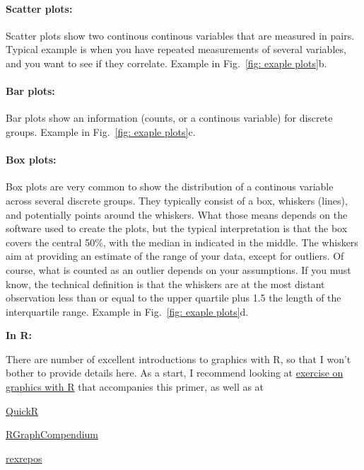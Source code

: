 \documentclass[a4paper,twoside]{tufte-book}\usepackage[]{graphicx}\usepackage[]{color}
\begin{document}
{\paragraph{Scatter plots:} Scatter plots show two continous continous variables that are measured in pairs. Typical example is when you have repeated measurements of several variables, and you want to see if they correlate. Example in Fig.~\ref{fig: exaple plots}b.

\paragraph{Bar plots:} Bar plots show an information (counts, or a continous variable) for discrete groups. Example in Fig.~\ref{fig: exaple plots}c.

\paragraph{Box plots:} Box plots are very common to show the distribution of a continous variable across several discrete groups. They typically consist of a box, whiskers (lines), and potentially points around the whiskers. What those means depends on the software used to create the plots, but the typical interpretation is that the box covers the central 50\%, with the median in indicated in the middle. The whiskers aim at providing an estimate of the range of your data, except for outliers. Of course, what is counted as an outlier depends on your assumptions. If you must know, the technical definition is that the whiskers are at the most distant observation less than or equal to the upper quartile plus 1.5 the length of the interquartile range. Example in Fig.~\ref{fig: exaple plots}d.

\vspace{1cm}
\begin{fullwidth}
\begin{mdframed}
    
\textbf{In R:} 

There are number of excellent introductions to graphics with R, so that I won't bother to provide details here. As a start, I recommend looking at \href{https://github.com/florianhartig/ResearchSkills/tree/master/Labs/Statistics/Practicals/GraphicsInR}{exercise on graphics with R} that accompanies this primer, as well as at 

\begin{itemize*}
  \item \href{http://www.statmethods.net/graphs/index.html}{QuickR}
  \item \href{http://shinyapps.org/apps/RGraphCompendium/index.php}{RGraphCompendium}
  \item \href{http://www.uni-kiel.de/psychologie/rexrepos/rerDiagrams.html}{rexrepos}
\end{itemize*}


\end{mdframed}
\end{fullwidth}}
\end{document}
